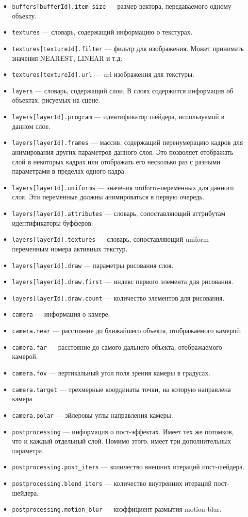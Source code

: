 \begin{itemize}
\item \texttt{buffers[bufferId].item\_size} --- размер вектора, передаваемого одному объекту.
\item \texttt{textures} --- словарь, содержащий информацию о текстурах.
\item \texttt{textures[textureId].filter} --- фильтр для изображения. Может принимать значения NEAREST, LINEAR и т.д.
\item \texttt{textures[textureId].url} --- url изображения для текстуры.
\item \texttt{layers} --- словарь, содержащий слои. В слоях содержится информация об объектах, рисуемых на сцене.
\item \texttt{layers[layerId].program} --- идентификатор шейдера, используемой в данном слое.
\item \texttt{layers[layerId].frames} --- массив, содержащий перенумерацию кадров для анимирования других параметров данного слоя. Это позволяет отображать слой в некоторых кадрах или отображать его несколько раз с разными параметрами в пределах одного кадра. 
\item \texttt{layers[layerId].uniforms} --- значения uniform-переменных для данного слоя. Эти переменные должны анимироваться в первую очередь. 
\item \texttt{layers[layerId].attributes} --- словарь, сопоставляющий аттрибутам идентификаторы буфферов.
\item \texttt{layers[layerId].textures} --- словарь, сопоставляющий uniform-переменным номера активных текстур.
\item \texttt{layers[layerId].draw} --- параметры рисования слоя.
\item \texttt{layers[layerId].draw.first} --- индекс первого элемента для рисования.
\item \texttt{layers[layerId].draw.count} --- количество элементов для рисования.
\item \texttt{camera} --- информация о камере.
\item \texttt{camera.near} --- расстояние до ближайшего объекта, отображаемого камерой.
\item \texttt{camera.far} --- расстояние до самого дальнего объекта, отображаемого камерой.
\item \texttt{camera.fov} --- вертикальный угол поля зрения камеры в градусах.
\item \texttt{camera.target} --- трехмерные координаты точки, на которую направлена камера
\item \texttt{camera.polar} --- эйлеровы углы направления камеры.
\item \texttt{postprocessing} --- информация о пост-эффектах. Имеет тех же потомков, что и каждый отдельный слой. Помимо этого, имеет три дополнительных параметра.
\item \texttt{postprocessing.post\_iters} --- количество внешних итераций пост-шейдера. 
\item \texttt{postprocessing.blend\_iters} --- количество внутренних итераций пост-шейдера.
\item \texttt{postprocessing.motion\_blur} --- коэффициент размытия motion blur.
\end{itemize}

